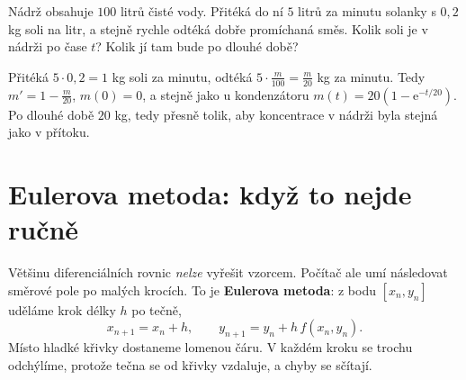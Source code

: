 \begin{problem}
  Nádrž obsahuje $100$ litrů čisté vody. Přitéká do ní $5$ litrů za minutu solanky s $0{,}2$ kg soli na litr, a stejně rychle odtéká dobře promíchaná směs. Kolik soli je v nádrži po čase $t$? Kolik jí tam bude po dlouhé době?
\end{problem}

\begin{solution}
  Přitéká $5\cdot 0{,}2 = 1$ kg soli za minutu, odtéká $5\cdot\frac{m}{100} = \frac{m}{20}$ kg za minutu. Tedy $m' = 1 - \frac{m}{20}$, $m(0) = 0$, a stejně jako u kondenzátoru $m(t) = 20\left(1 - \mathrm{e}^{-t/20}\right)$. Po dlouhé době $20$ kg, tedy přesně tolik, aby koncentrace v nádrži byla stejná jako v přítoku.
\end{solution}

\section{Eulerova metoda: když to nejde ručně}

Většinu diferenciálních rovnic \textit{nelze} vyřešit vzorcem. Počítač ale umí následovat směrové pole po malých krocích. To je \textbf{Eulerova metoda}: z bodu $[x_n, y_n]$ uděláme krok délky $h$ po tečně,
\begin{equation*}
  x_{n+1} = x_n + h,\qquad y_{n+1} = y_n + h\,f(x_n, y_n).
\end{equation*}
Místo hladké křivky dostaneme lomenou čáru. V každém kroku se trochu odchýlíme, protože tečna se od křivky vzdaluje, a chyby se sčítají.

\begin{center}
\end{center}

